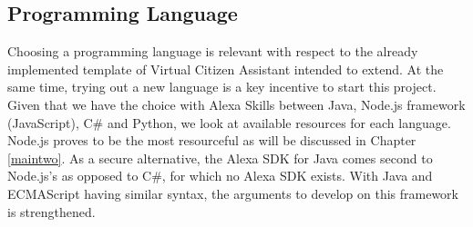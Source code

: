 	
	
	\subsection*{Programming Language}
	Choosing a programming language is relevant %
	with respect to the already implemented template of %
	Virtual Citizen Assistant %
	intended to extend. At the same time, trying out a new language is a key incentive to start this project. Given that we have the %
	choice with Alexa Skills between Java, Node.js framework (JavaScript), C\# and Python, we look at available resources for each language. Node.js proves to be the most resourceful as will be discussed in Chapter \ref{maintwo}. As a secure alternative, the Alexa SDK for Java comes second to Node.js's as opposed to C\#, for which no Alexa SDK exists. With Java and ECMAScript having similar syntax, the arguments to develop on this framework is strengthened.
	



%
%




%



